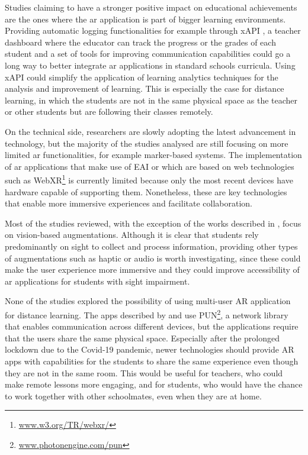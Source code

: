 Studies claiming to have a stronger positive impact on educational achievements are the ones where the \gls{ar} application is part of bigger learning environments. Providing automatic logging functionalities \textendash{} for example through xAPI \citep{kevan2016experience} \textendash{}, a teacher dashboard where the educator can track the progress or the grades of each student and a set of tools for improving communication capabilities could go a long way to better integrate \gls{ar} applications in standard schools curricula. Using xAPI could simplify the application of learning analytics techniques for the analysis and improvement of learning. This is especially the case for distance learning, in which the students are not in the same physical space as the teacher or other students but are following their classes remotely.

On the technical side, researchers are slowly adopting the latest advancement in technology, but the majority of the studies analysed are still focusing on more limited \gls{ar} functionalities, for example marker-based systems. The implementation of \gls{ar} applications that make use of \gls{EAI} or which are based on web technologies such as WebXR\footnote{\url{www.w3.org/TR/webxr/}} is currently limited because only the most recent devices have hardware capable of supporting them. Nonetheless, these are key technologies that enable more immersive experiences and facilitate collaboration. 

Most of the studies reviewed, with the exception of the works described in \cite{chen2018application, kenoui2020teach, mikulowski2020multi}, focus on vision-based augmentations. Although it is clear that students rely predominantly on sight to collect and process information, providing other types of augmentations such as haptic or audio is worth investigating, since these could make the user experience more immersive and they could improve accessibility of \gls{ar} applications for students with sight impairment.

None of the studies explored the possibility of using multi-user AR application for distance learning. The apps described by \cite{oh2017hybrid} and \cite{lopez2020emofindar} use PUN\footnote{\url{www.photonengine.com/pun}}, a network library that enables communication across different devices, but the applications require that the users share the same physical space. Especially after the prolonged lockdown due to the Covid-19 pandemic, newer technologies should provide AR apps with capabilities for the students to share the same experience even though they are not in the same room. This would be useful for teachers, who could make remote lessons more engaging, and for students, who would have the chance to work together with other schoolmates, even when they are at home.  

